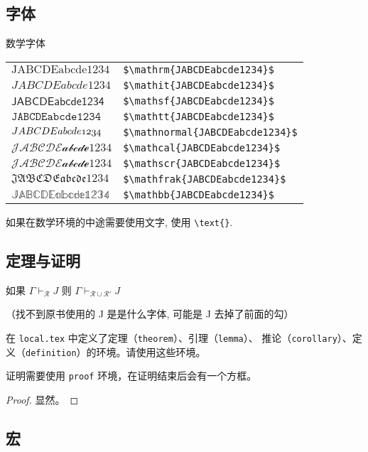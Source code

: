 \subsection{字体}

数学字体

\begin{tabular}{ll}
$\mathrm{JABCDEabcde1234}$      &  \verb!$\mathrm{JABCDEabcde1234}$!     \\
$\mathit{JABCDEabcde1234}$      &  \verb!$\mathit{JABCDEabcde1234}$!     \\
$\mathsf{JABCDEabcde1234}$      &  \verb!$\mathsf{JABCDEabcde1234}$!     \\
$\mathtt{JABCDEabcde1234}$      &  \verb!$\mathtt{JABCDEabcde1234}$!     \\
$\mathnormal{JABCDEabcde1234}$  &  \verb!$\mathnormal{JABCDEabcde1234}$! \\
$\mathcal{JABCDEabcde1234}$     &  \verb!$\mathcal{JABCDEabcde1234}$!    \\
$\mathscr{JABCDEabcde1234}$     &  \verb!$\mathscr{JABCDEabcde1234}$!    \\
$\mathfrak{JABCDEabcde1234}$    &  \verb!$\mathfrak{JABCDEabcde1234}$!   \\
$\mathbb{JABCDEabcde1234}$      &  \verb!$\mathbb{JABCDEabcde1234}$!     \\
\end{tabular}

如果在数学环境的中途需要使用文字, 使用 \verb!\text{}!.

\subsection{定理与证明}

\begin{theorem}[稳定性]\label{theorem:stability}
 如果 $\Gamma \vdash_{\mathcal{R}} J$ 则 $\Gamma \vdash_{\mathcal{R} \cup \mathcal{R}'} J$
\end{theorem}

（找不到原书使用的 J 是是什么字体, 可能是 J 去掉了前面的勾）

在 \texttt{local.tex} 中定义了定理（\texttt{theorem}）、引理（\texttt{lemma}）、
推论（\texttt{corollary}）、定义（\texttt{definition}）的环境。请使用这些环境。


证明需要使用 \texttt{proof} 环境，在证明结束后会有一个方框。
\begin{proof}
    显然。
\end{proof}


\subsection{宏}

